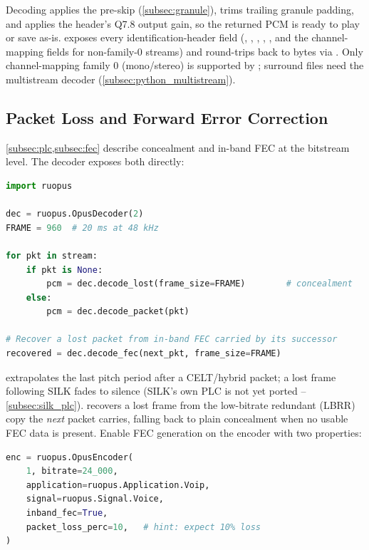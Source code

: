 Decoding applies the  pre-skip (\cref{subsec:granule}), trims
trailing granule padding, and applies the header's Q7.8 output gain, so the
returned PCM is ready to play or save as-is.  exposes every
identification-header field (, ,
  , , , and the
channel-mapping fields for non-family-0 streams) and round-trips back to bytes
via . Only channel-mapping family 0 (mono/stereo) is
supported by ; surround files need the multistream
decoder (\cref{subsec:python_multistream}).

\subsection{Packet Loss and Forward Error Correction}\label{subsec:python_fec}

\cref{subsec:plc,subsec:fec} describe concealment and in-band FEC at the
bitstream level. The decoder exposes both directly:

\begin{lstlisting}[language=Python]
import ruopus

dec = ruopus.OpusDecoder(2)
FRAME = 960  # 20 ms at 48 kHz

for pkt in stream:
    if pkt is None:
        pcm = dec.decode_lost(frame_size=FRAME)        # concealment
    else:
        pcm = dec.decode_packet(pkt)

# Recover a lost packet from in-band FEC carried by its successor
recovered = dec.decode_fec(next_pkt, frame_size=FRAME)
\end{lstlisting}

 extrapolates the last pitch period after a CELT/hybrid
packet; a lost frame following SILK fades to silence (SILK's own PLC is not
yet ported -- \cref{subsec:silk_plc}).  recovers a lost
frame from the low-bitrate redundant (LBRR) copy the \emph{next} packet
carries, falling back to plain concealment when no usable FEC data is
present. Enable FEC generation on the encoder with two properties:

\begin{lstlisting}[language=Python]
enc = ruopus.OpusEncoder(
    1, bitrate=24_000,
    application=ruopus.Application.Voip,
    signal=ruopus.Signal.Voice,
    inband_fec=True,
    packet_loss_perc=10,   # hint: expect 10% loss
)
\end{lstlisting}

